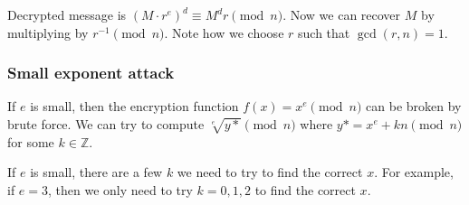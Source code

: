 \documentclass[letterpaper,12pt,oneside]{article}
\begin{document}
Decrypted message is $(M\cdot r^e)^d \equiv M^d r \pmod n$. Now we can recover $M$ by multiplying by $r^{-1} \pmod n$. Note how we choose $r$ such that $\gcd(r,n)=1$.
\subsubsection{Small exponent attack}
If $e$ is small, then the encryption function $f(x)=x^e \pmod n$ can be broken by brute force. We can try to compute $\sqrt[e]{y*} \pmod n$ where $y* = x^e + kn \pmod n$ for some $k\in \mathbb{Z}$.

If $e$ is small, there are a few $k$ we need to try to find the correct $x$. For example, if $e=3$, then we only need to try $k=0,1,2$ to find the correct $x$.
\end{document}
